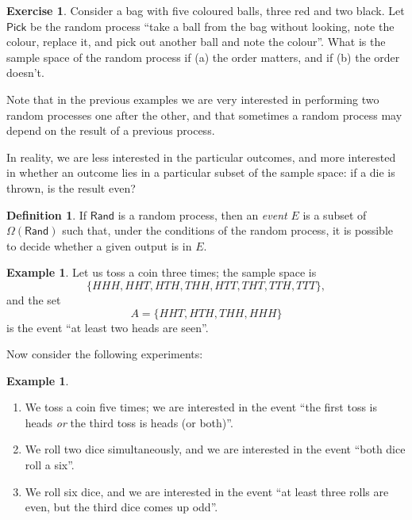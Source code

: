 \documentclass[a4paper,10pt]{article}
\newcommand{\rand}{\mathsf{Rand}}
\theoremstyle{definition}
\newtheorem{defn}[thm]{Definition}
\newtheorem{ex}[thm]{Example}
\newtheorem{exercise}[thm]{Exercise}
\begin{document}
\begin{exercise}
  Consider a bag with five coloured balls, three red and two black. Let $ \mathsf{Pick} $ be the random
  process ``take a ball from the bag without looking, note the colour, replace it, and pick out another ball and note the colour''.
  What is the sample space of the random process if (a) the order matters, and if (b) the order doesn't.
\end{exercise}

Note that in the previous examples we are very interested in performing two random processes one after the other, and that
sometimes a random process may depend on the result of a previous process.


In reality, we are less interested in the particular outcomes, and more interested in whether an outcome lies
in a particular subset of the sample space: if a die is thrown, is the result even?

\begin{defn}
  If $ \rand $ is a random process, then an \emph{event} $ E $ is a subset of $ \Omega(\rand) $  such that, under the conditions
  of the random process, it is possible to decide whether a given output is in $ E $.
\end{defn}

\begin{ex}
  Let us toss a coin three times; the sample space is
  \begin{displaymath}
    \{HHH, HHT, HTH, THH, HTT, THT, TTH, TTT\},
  \end{displaymath}
  and the set
  \begin{displaymath}
    A = \{HHT, HTH, THH, HHH\}
  \end{displaymath}
  is the event ``at least two heads are seen''.
\end{ex}

Now consider the following experiments:
\begin{ex}\leavevmode
  \begin{enumerate}
    \item We toss a coin five times; we are interested in the event ``the first toss is heads \emph{or} the third toss is heads (or both)''.
    \item We roll two dice simultaneously, and we are interested in the event ``both dice roll a six''.
    \item We roll six dice, and we are interested in the event ``at least three rolls are even, but the third dice comes up odd''.
  \end{enumerate}
\end{ex}
\end{document}
